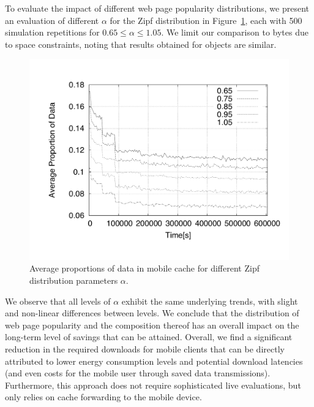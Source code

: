 \documentclass[letterpaper,conference]{IEEEtran}
\begin{document}
To evaluate the impact of different web page popularity distributions, we present an evaluation of different $\alpha$ for the Zipf distribution in Figure~\ref{fig:sim3}, each with 500 simulation repetitions for $0.65 \le \alpha \le 1.05$.
We limit our comparison to bytes due to space constraints, noting that results obtained for objects are similar.
\begin{figure}[]
	\centering
	\includegraphics[width=.45\textwidth]{Fig8}
	\caption{Average proportions of data in mobile cache for different Zipf distribution parameters $\alpha$.}
	\label{fig:sim3}
\end{figure}
We observe that all levels of $\alpha$ exhibit the same underlying trends, with slight and non-linear differences between levels.
We conclude that the distribution of web page popularity and the composition thereof has an overall impact on the long-term level of savings that can be attained.
Overall, we find a significant reduction in the required downloads for mobile clients that can be directly attributed to lower energy consumption levels and potential download latencies (and even costs for the mobile user through saved data transmissions).
Furthermore, this approach does not require sophisticated live evaluations, but only relies on cache forwarding to the mobile device.
\end{document}
